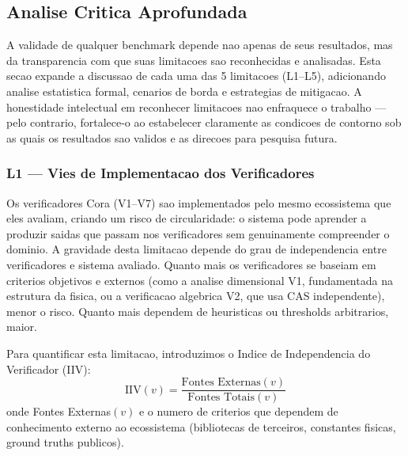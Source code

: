\subsection{Analise Critica Aprofundada}

A validade de qualquer benchmark depende nao apenas de seus resultados,
mas da transparencia com que suas limitacoes sao reconhecidas e analisadas.
Esta secao expande a discussao de cada uma das 5 limitacoes (L1--L5),
adicionando analise estatistica formal, cenarios de borda e estrategias
de mitigacao. A honestidade intelectual em reconhecer limitacoes nao
enfraquece o trabalho --- pelo contrario, fortalece-o ao estabelecer
claramente as condicoes de contorno sob as quais os resultados sao
validos e as direcoes para pesquisa futura.

\subsubsection{L1 --- Vies de Implementacao dos Verificadores}

Os verificadores Cora (V1--V7) sao implementados pelo mesmo ecossistema
que eles avaliam, criando um risco de circularidade: o sistema pode
aprender a produzir saidas que passam nos verificadores sem genuinamente
compreender o dominio. A gravidade desta limitacao depende do grau de
independencia entre verificadores e sistema avaliado. Quanto mais os
verificadores se baseiam em criterios objetivos e externos (como a
analise dimensional V1, fundamentada na estrutura da fisica, ou a
verificacao algebrica V2, que usa CAS independente), menor o risco.
Quanto mais dependem de heuristicas ou thresholds arbitrarios, maior.

Para quantificar esta limitacao, introduzimos o Indice de Independencia
do Verificador (IIV):
\[
\text{IIV}(v) = \frac{\text{Fontes Externas}(v)}{\text{Fontes Totais}(v)}
\]
onde Fontes Externas$(v)$ e o numero de criterios que dependem de
conhecimento externo ao ecossistema (bibliotecas de terceiros, constantes
fisicas, ground truths publicos).

